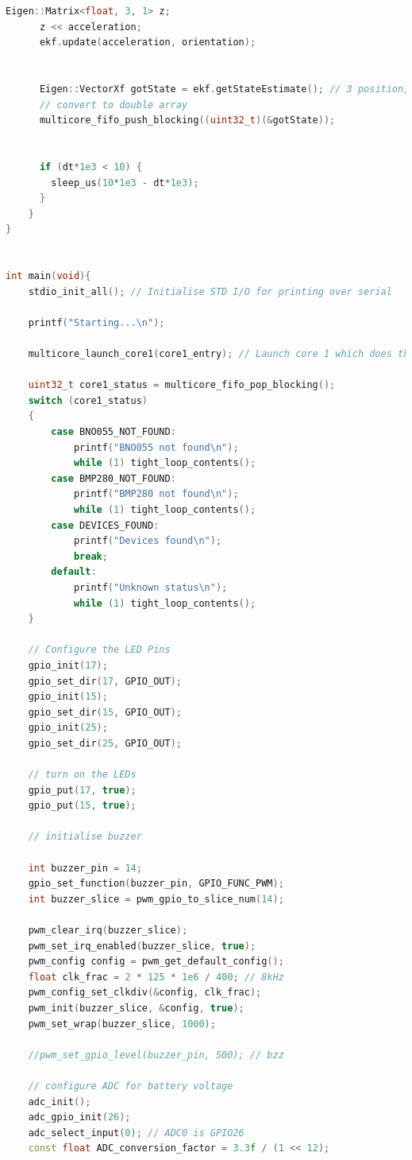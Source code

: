 \documentclass{article}
\begin{document}
\begin {lstlisting}[language=C++]
      Eigen::Matrix<float, 3, 1> z;
      z << acceleration;
      ekf.update(acceleration, orientation);


      Eigen::VectorXf gotState = ekf.getStateEstimate(); // 3 position, 4 quaternion
      // convert to double array
      multicore_fifo_push_blocking((uint32_t)(&gotState));

      
      if (dt*1e3 < 10) {
        sleep_us(10*1e3 - dt*1e3);
      }
    }
}


int main(void){
    stdio_init_all(); // Initialise STD I/O for printing over serial

    printf("Starting...\n");

    multicore_launch_core1(core1_entry); // Launch core 1 which does the slower I2C comms

    uint32_t core1_status = multicore_fifo_pop_blocking();
    switch (core1_status)
    {
        case BNO055_NOT_FOUND:
            printf("BNO055 not found\n");
            while (1) tight_loop_contents();
        case BMP280_NOT_FOUND:
            printf("BMP280 not found\n");
            while (1) tight_loop_contents();
        case DEVICES_FOUND:
            printf("Devices found\n");
            break;
        default:
            printf("Unknown status\n");
            while (1) tight_loop_contents();
    }

    // Configure the LED Pins
    gpio_init(17);
    gpio_set_dir(17, GPIO_OUT);
    gpio_init(15);
    gpio_set_dir(15, GPIO_OUT);
    gpio_init(25);
    gpio_set_dir(25, GPIO_OUT);

    // turn on the LEDs
    gpio_put(17, true);
    gpio_put(15, true);

    // initialise buzzer

    int buzzer_pin = 14;
    gpio_set_function(buzzer_pin, GPIO_FUNC_PWM);
    int buzzer_slice = pwm_gpio_to_slice_num(14);
    
    pwm_clear_irq(buzzer_slice);
    pwm_set_irq_enabled(buzzer_slice, true);
    pwm_config config = pwm_get_default_config();
    float clk_frac = 2 * 125 * 1e6 / 400; // 8kHz
    pwm_config_set_clkdiv(&config, clk_frac);
    pwm_init(buzzer_slice, &config, true);
    pwm_set_wrap(buzzer_slice, 1000);

    //pwm_set_gpio_level(buzzer_pin, 500); // bzz

    // configure ADC for battery voltage
    adc_init();
    adc_gpio_init(26);
    adc_select_input(0); // ADC0 is GPIO26
    const float ADC_conversion_factor = 3.3f / (1 << 12);


\end{lstlisting}
\end{document}
